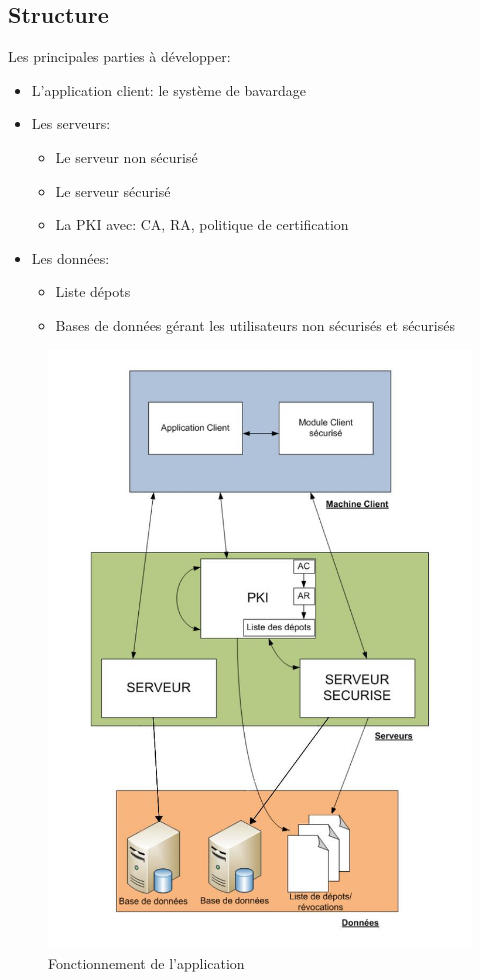 \documentclass[a4paper,11pt,french]{article}
\begin{document}
\subsection{Structure}
Les principales parties à développer:
\begin{itemize}
\item L'application client: le système de bavardage
\item Les serveurs:
\begin{itemize}
\item Le serveur non sécurisé
\item Le serveur sécurisé
\item La PKI avec: CA, RA, politique de certification
\end{itemize}
\item Les données:
\begin{itemize}
\item Liste dépots
\item Bases de données gérant les utilisateurs non sécurisés et sécurisés
\end{itemize}
\end{itemize}

\begin{figure}[!htbp]
\centerline{\includegraphics[width=12cm]{Arch.jpg} }
\caption{Fonctionnement de l'application}
\end{figure}
\end{document}
